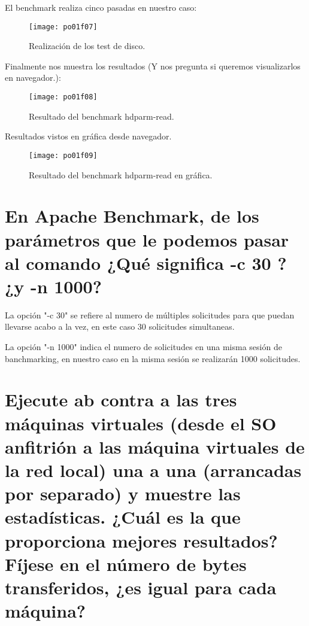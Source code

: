 El benchmark realiza cinco pasadas en nuestro caso:
\begin{figure}[H]
	\centering
	\texttt{[image: po01f07]}
	\caption{Realización de los test de disco.}
	\label{fig:po01f07}
\end{figure}

Finalmente nos muestra los resultados (Y nos pregunta si queremos visualizarlos en navegador.):
\begin{figure}[H]
	\centering
	\texttt{[image: po01f08]}
	\caption{Resultado del benchmark hdparm-read.}
	\label{fig:po01f08}
\end{figure}

Resultados vistos en gráfica desde navegador.
\begin{figure}[H]
	\centering
	\texttt{[image: po01f09]}
	\caption{Resultado del benchmark hdparm-read en gráfica.}
	\label{fig:po01f09}
\end{figure}

\section{En Apache Benchmark, de los parámetros que le podemos pasar al comando ¿Qué significa -c 30 ? ¿y -n 1000?}

La opción "-c 30" se refiere al numero de múltiples solicitudes para que puedan llevarse acabo a la vez, en este caso 30 solicitudes simultaneas.

La opción "-n 1000" indica el numero de solicitudes en una misma sesión de banchmarking, en nuestro caso en la misma sesión se realizarán 1000 solicitudes.


\section{Ejecute ab contra a las tres máquinas virtuales (desde el SO anfitrión a las máquina virtuales de la red local) una a una (arrancadas por separado) y muestre las estadísticas. ¿Cuál es la que proporciona mejores 	resultados? Fíjese en el número de bytes transferidos, ¿es igual para cada máquina?}


